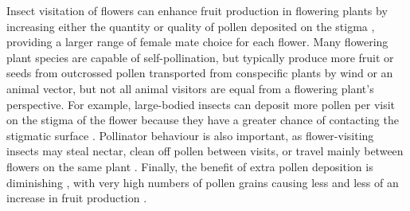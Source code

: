 \documentclass[12pt]{article} %
\begin{document}
Insect visitation of flowers can enhance fruit production in flowering plants by increasing either the quantity or quality of pollen deposited on the stigma \citep{stephenson1981,burd1994,aizen2007}, providing a larger range of female mate choice for each flower.
Many flowering plant species are capable of self-pollination, but typically produce more fruit or seeds from outcrossed pollen \citep{knight2005} transported from conspecific plants by wind or an animal vector, but not all animal visitors are equal from a flowering plant's perspective.
For example, large-bodied insects can deposit more pollen per visit on the stigma of the flower because they have a greater chance of contacting the stigmatic surface \citep{sahli2007}. 
Pollinator behaviour is also important, as flower-visiting insects may steal nectar, clean off pollen between visits, or travel mainly between flowers on the same plant \citep{thomson1986, herrera1987}.
Finally, the benefit of extra pollen deposition is diminishing \citep{plowright1981}, with very high numbers of pollen grains causing less and less of an increase in fruit production \citep{ashman2004, harder2016}.
\end{document}
